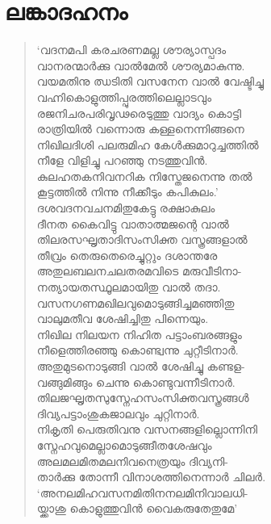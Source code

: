 
\section{ലങ്കാദഹനം}

\begin{verse}
‘വദനമപി കരചരണമല്ല ശൗര്യാസ്പദം\\
വാനരന്മാര്‍ക്കു വാല്‍മേല്‍ ശൗര്യമാകുന്നു.\\
വയമതിനു ഝടിതി വസനേന വാല്‍ വേഷ്ടിച്ചു\\
വഹ്നികൊളുത്തിപ്പുരത്തിലെല്ലാടവും\\
രജനിചരപരിവൃഢരെടുത്തു വാദ്യം കൊട്ടി\\
രാത്രിയില്‍ വന്നൊരു കള്ളനെന്നിങ്ങനെ\\
നിഖിലദിശി പലരുമിഹ കേള്‍ക്കുമാറുച്ചത്തില്‍\\
നീളേ വിളിച്ചു പറഞ്ഞു നടത്തുവിന്‍.\\
കുലഹതകനിവനറിക നിസ്തേജനെന്നു തല്‍\\
കൂട്ടത്തില്‍ നിന്നു നീക്കീടും കപികുലം.’\\
ദശവദനവചനമിതുകേട്ടു രക്ഷാകുലം\\
ദീനത കൈവിട്ടു വാതാത്മജന്റെ വാല്‍\\
തിലരസഘൃതാദിസംസിക്ത വസ്ത്രങ്ങളാല്‍\\
തീവ്രം തെരുതെരെച്ചുറ്റും ദശാന്തരേ\\
അതുലബലനചലതരമവിടെ മരുവീടിനാ-\\
നത്യായതസ്ഥൂലമായിതു വാല്‍ തദാ.\\
വസനഗണമഖിലവുമൊടുങ്ങിച്ചമഞ്ഞിതു\\
വാലുമതീവ ശേഷിച്ചിതു പിന്നെയും.\\
നിഖില നിലയന നിഹിത പട്ടാംബരങ്ങളും\\
നീളെത്തിരഞ്ഞു കൊണ്ട്വന്നു ചുറ്റീടിനാര്‍.\\
അതുമുടനൊടുങ്ങി വാല്‍ ശേഷിച്ചു കണ്ടള-\\
വങ്ങുമിങ്ങും ചെന്നു കൊണ്ടുവന്നീടിനാര്‍.\\
തിലജഘൃതസുസ്നേഹസംസിക്തവസ്ത്രങ്ങള്‍\\
ദിവ്യപട്ടാംശുകജാലവും ചുറ്റിനാര്‍.\\
നികൃതി പെരുതിവനു വസനങ്ങളില്ലൊന്നിനി\\
സ്നേഹവുമെല്ലാമൊടുങ്ങീതശേഷവും\\
അലമലമിതമലനിവനെത്രയും ദിവ്യനി-\\
താര്‍ക്കു തോന്നീ വിനാശത്തിനെന്നാര്‍ ചിലര്‍.\\
‘അനലമിഹവസനമിതിനനലമിനിവാലധി-\\
യ്ക്കാശു കൊളുത്തുവിന്‍ വൈകരുതേതുമേ’\\

\end{verse}
